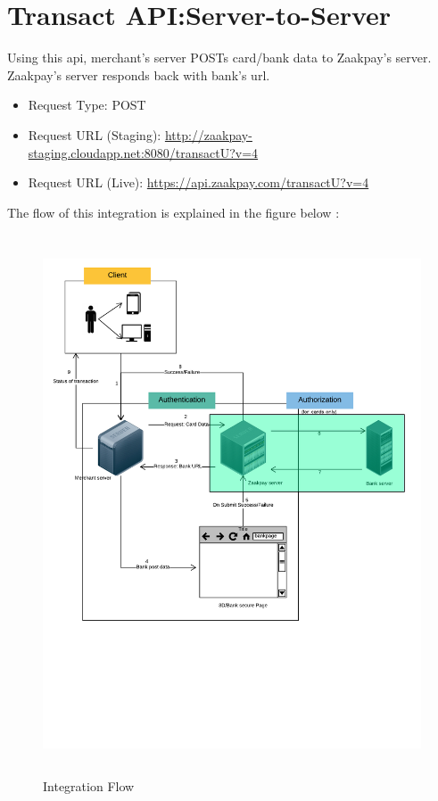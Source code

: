 \documentclass{article}
\begin{document}
\newpage
\section{Transact API:Server-to-Server}
Using this api, merchant’s server POSTs card/bank data to Zaakpay’s server. Zaakpay’s server responds back 
with bank’s url.

\begin{itemize}
\item Request Type:	POST 
\item Request URL (Staging): \url{http://zaakpay-staging.cloudapp.net:8080/transactU?v=4}
\item Request URL (Live):	\url{https://api.zaakpay.com/transactU?v=4}
\end{itemize}

The flow of this integration is explained in the figure below :
\begin{figure}[H]
\centering
\caption{Integration Flow}
\includegraphics[width=1.2\textwidth,height=6.3in]{TransactU-_Flow.png}
\end{figure}
\end{document}

